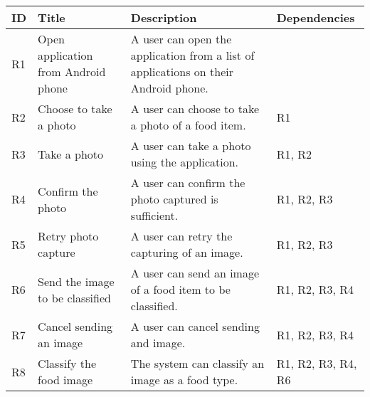 \begin{longtable}{|p{.75cm}|p{3.5cm}|p{6cm}|p{2.5cm}|}
\hline
\textbf{ID} & \textbf{Title}                                              & \textbf{Description}                                                                                    & Dependencies                                   \\ \hline
R1          & Open application from Android phone                         & A user can open the application from a list of applications on their Android phone.                     &                                                \\ \hline
R2          & Choose to take a photo                                      & A user can choose to take a photo of a food item.                                                       & R1                                             \\ \hline
R3          & Take a photo                                                & A user can take a photo using the application.                                                          & R1, R2                                         \\ \hline
R4          & Confirm the photo                                           & A user can confirm the photo captured is sufficient.                                                    & R1, R2, R3                                     \\ \hline
R5          & Retry photo capture                                         & A user can retry the capturing of an image.                                                             & R1, R2, R3                                     \\ \hline
R6          & Send the image to be classified                             & A user can send an image of a food item to be classified.                                               & R1, R2, R3, R4                                 \\ \hline
R7          & Cancel sending an image                                     & A user can cancel sending and image.                                                                    & R1, R2, R3, R4                                 \\ \hline
R8          & Classify the food image                                     & The system can classify an image as a food type.                                                        & R1, R2, R3, R4, R6                             \\ \hline

\end{longtable}
